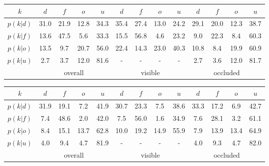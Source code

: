 \begin{center}
	\footnotesize 
	\begin{tabular}{c|cccc|cccc|cccc}		
		$k$ & $d$ & $f$ & $o$ & $u$ & $d$ & $f$ & $o$ & $u$ & $d$ & $f$ & $o$ & $u$\\
		\hline
		$p(k|d)$ & \textcolor{mygreen}{31.0} & 21.9 & 12.8 & 34.3 & \textcolor{mygreen}{35.4} & 27.4 & 13.0 & 24.2 & \textcolor{mygreen}{29.1} & 20.0 & 12.3 & 38.7\\
		$p(k|f)$ &  13.6 & \textcolor{mygreen}{47.5} & 5.6 & 33.3 & 15.5 & \textcolor{mygreen}{56.8} & 4.6 & 23.2 & 9.0 & \textcolor{mygreen}{22.3} & 8.4 & 60.3\\
		$p(k|o)$ &  13.5 & 9.7 & \textcolor{mygreen}{20.7} & 56.0 & 22.4 & 14.3 & \textcolor{mygreen}{23.0} & 40.3 & 10.8 & 8.4 & \textcolor{mygreen}{19.9} & 60.9\\
		$p(k|u)$ &  2.7 & 3.7 & 12.0 & \textcolor{mygreen}{81.6} & - & - & - & - & 2.7 & 3.6 & 12.0 & \textcolor{mygreen}{81.7}\\
		\hline
		& \multicolumn{4}{c|}{overall} & \multicolumn{4}{c|}{visible} & \multicolumn{4}{c}{occluded}
	\end{tabular}
\end{center}
\begin{center}
	\footnotesize 
	\begin{tabular}{c|cccc|cccc|cccc}		
		$k$ & $d$ & $f$ & $o$ & $u$ & $d$ & $f$ & $o$ & $u$ & $d$ & $f$ & $o$ & $u$\\
		\hline
		$p(k|d)$ & \textcolor{mygreen}{31.9} & 19.1 & 7.2 & 41.9 & \textcolor{mygreen}{30.7} & 23.3 & 7.5 & 38.6 & \textcolor{mygreen}{33.3} & 17.2 & 6.9 & 42.7\\
		$p(k|f)$ &  7.4 & \textcolor{mygreen}{48.6} & 2.0 & 42.0 & 7.5 & \textcolor{mygreen}{56.0} & 1.6 & 34.9 & 7.6 & \textcolor{mygreen}{28.1} & 3.2 & 61.1\\
		$p(k|o)$ &  8.4 & 15.1 & \textcolor{mygreen}{13.7} & 62.8 & 10.0 & 19.2 & \textcolor{mygreen}{14.9} & 55.9 & 7.9 & 13.9 & \textcolor{mygreen}{13.4} & 64.9\\
		$p(k|u)$ &  4.0 & 9.4 & 4.7 & \textcolor{mygreen}{81.9} & - & - & - & - & 4.0 & 9.3 & 4.7 & \textcolor{mygreen}{82.0}\\
		\hline
		& \multicolumn{4}{c|}{overall} & \multicolumn{4}{c|}{visible} & \multicolumn{4}{c}{occluded}
	\end{tabular}
\end{center}
